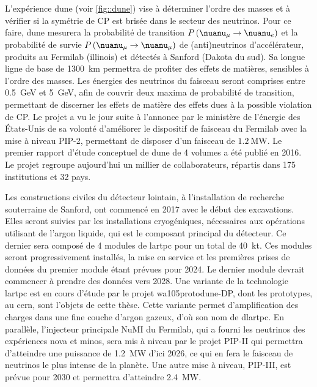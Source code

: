   L'expérience \gls{dune} (voir \autoref{fig::dune}) vise à déterminer l'ordre des masses et à vérifier si la symétrie de CP est brisée dans le secteur des neutrinos. Pour ce faire, \gls{dune} mesurera la probabilité de transition $P\left(\nuanu_{\mu}\to\nuanu_e\right)$ et la probabilité de survie $P\left(\nuanu_{\mu}\to\nuanu_{\mu}\right)$ de (anti)neutrinos d'accélérateur, produits au Fermilab (illinois) et détectés à Sanford (Dakota du sud). Sa longue ligne de base de \SI{1300}{\kilo\meter} permettra de profiter des effets de matières, sensibles à l'ordre des masses. Les énergies des neutrinos du faisceau seront comprises entre \SI{0.5}{\giga\electronvolt} et \SI{5}{\giga\electronvolt}, afin de couvrir deux maxima de probabilité de transition, permettant de discerner les effets de matière des effets dues à la possible violation de CP. Le projet a vu le jour suite à l'annonce par le ministère de l'énergie des États-Unis de sa volonté d'améliorer le dispositif de faisceau du Fermilab avec la mise à niveau PIP-2, permettant de disposer d'un faisceau de $\SI{1.2}{\mega\watt}$. Le premier rapport d'étude conceptuel de \gls{dune} de 4 volumes a été publié en 2016. Le projet regroupe aujourd'hui un millier de collaborateurs, répartis dans 175 institutions et 32 pays.

  Les constructions civiles du détecteur lointain, à l'installation de recherche souterraine de Sanford, ont commencé en 2017 avec le début des excavations. Elles seront suivies par les installations cryogéniques, nécessaires aux opérations utilisant de l'argon liquide, qui est le composant principal du détecteur. Ce dernier sera composé de 4 modules de \gls{lartpc} pour un total de \SI{40}{\kilo\tonne}. Ces modules seront progressivement installés, la mise en service et les premières prises de données du premier module étant prévues pour 2024\cite{Acciarri2016}. Le dernier module devrait commencer à prendre des données vers 2028. Une variante de la technologie \gls{lartpc} est en cours d'étude par le projet  \gls{wa105}proto\gls{dune}-DP, dont les prototypes, au \gls{cern}, sont l'objets de cette thèse. Cette variante permet d'amplification des charges dans une fine couche d'argon gazeux, d'où son nom de \gls{dlartpc}. En parallèle, l'injecteur principale NuMI du Fermilab, qui a fourni les neutrinos des expériences \gls{nova} et \gls{minos}, sera mis à niveau par le projet PIP-II qui permettra d'atteindre une puissance de \SI{1.2}{\mega\watt} d'ici 2026, ce qui en fera le faisceau de neutrinos le plus intense de la planète. Une autre mise à niveau, PIP-III, est prévue pour 2030 et permettra d'atteindre \SI{2.4}{\mega\watt}.


